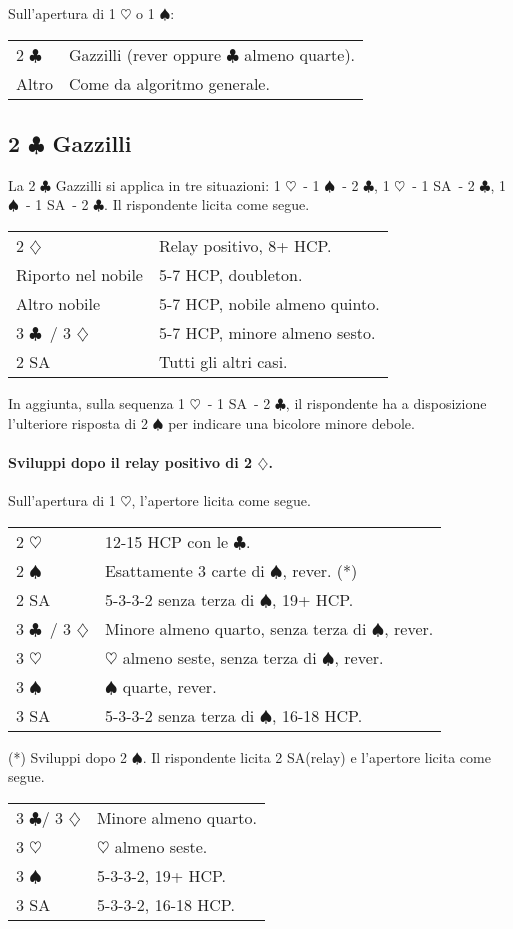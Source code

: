 \documentclass[a4paper,10pt]{article}
\renewcommand{\c}{$\clubsuit$\xspace}
\renewcommand{\d}{$\diamondsuit$\xspace}
\newcommand{\h}{$\heartsuit$\xspace}
\newcommand{\s}{$\spadesuit$\xspace}
\newcommand{\sa}{SA\xspace}
\newcommand{\smallspace}{\vskip0.3cm}
\newenvironment{twocol}
  {\smallspace\noindent\begin{tabular}{l p{0.78\textwidth}}}
  {\end{tabular}\smallspace}
\begin{document}
\noindent Sull'apertura di 1 \h o 1 \s:
\begin{twocol}
  2 \c & Gazzilli (rever oppure \c almeno quarte). \\
  Altro & Come da algoritmo generale.
\end{twocol}


\subsection{2 \c Gazzilli}

La 2 \c Gazzilli si applica in tre situazioni: 1 \h\ - 1 \s\ - 2 \c, 1 \h\ - 1 \sa\ - 2 \c, 1 \s\ - 1 \sa\ - 2 \c.
Il rispondente licita come segue.

\begin{twocol}
  2 \d & Relay positivo, 8+ HCP. \\
  Riporto nel nobile & 5-7 HCP, doubleton. \\
  Altro nobile & 5-7 HCP, nobile almeno quinto. \\
  3 \c\ / 3 \d & 5-7 HCP, minore almeno sesto. \\
  2 \sa & Tutti gli altri casi.
\end{twocol}

In aggiunta, sulla sequenza 1 \h\ - 1 \sa\ - 2 \c, il rispondente ha a disposizione l'ulteriore risposta di 2 \s per indicare una bicolore minore debole.

\paragraph{Sviluppi dopo il relay positivo di 2 \d.}
Sull'apertura di 1 \h, l'apertore licita come segue.

\begin{twocol}
  2 \h & 12-15 HCP con le \c. \\
  2 \s & Esattamente 3 carte di \s, rever. (*)\\
  2 \sa & 5-3-3-2 senza terza di \s, 19+ HCP. \\
  3 \c\ / 3 \d & Minore almeno quarto, senza terza di \s, rever. \\
  3 \h & \h almeno seste, senza terza di \s, rever. \\
  3 \s & \s quarte, rever. \\
  3 \sa & 5-3-3-2 senza terza di \s, 16-18 HCP.
\end{twocol}

\noindent (*) Sviluppi dopo 2 \s. Il rispondente licita 2 \sa (relay) e l'apertore licita come segue.
\begin{twocol}
  3 \c / 3 \d & Minore almeno quarto. \\
  3 \h & \h almeno seste. \\
  3 \s & 5-3-3-2, 19+ HCP. \\
  3 \sa & 5-3-3-2, 16-18 HCP.
\end{twocol}
\end{document}
